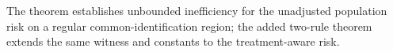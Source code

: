 The theorem establishes unbounded inefficiency for the unadjusted population risk on a regular common-identification region; the added two-rule theorem extends the same witness and constants to the treatment-aware risk.
